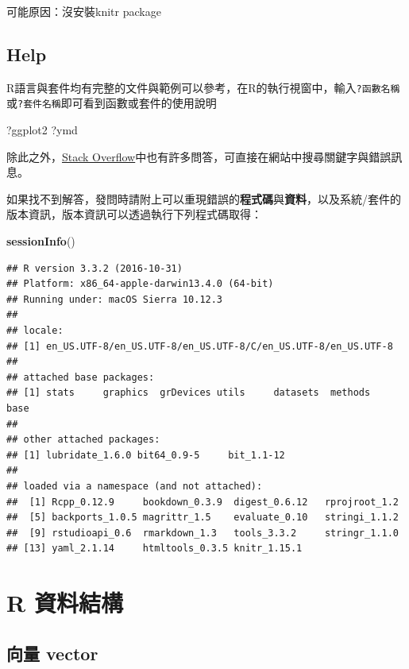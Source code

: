 \documentclass[]{book}
\newenvironment{Shaded}{\begin{snugshade}}{\end{snugshade}}
\newcommand{\KeywordTok}[1]{\textcolor[rgb]{0.13,0.29,0.53}{\textbf{{#1}}}}
\newcommand{\NormalTok}[1]{{#1}}
\theoremstyle{definition}
\theoremstyle{definition}
\theoremstyle{remark}
\begin{document}
可能原因：沒安裝knitr package

\section{Help}\label{help}

R語言與套件均有完整的文件與範例可以參考，在R的執行視窗中，輸入\texttt{?函數名稱}或\texttt{?套件名稱}即可看到函數或套件的使用說明

\begin{Shaded}
\begin{Highlighting}[]
\NormalTok{?ggplot2}
\NormalTok{?ymd}
\end{Highlighting}
\end{Shaded}

除此之外，\href{http://stackoverflow.com/}{Stack
Overflow}中也有許多問答，可直接在網站中搜尋關鍵字與錯誤訊息。

如果找不到解答，發問時請附上可以重現錯誤的\textbf{程式碼}與\textbf{資料}，以及系統/套件的版本資訊，版本資訊可以透過執行下列程式碼取得：

\begin{Shaded}
\begin{Highlighting}[]
\KeywordTok{sessionInfo}\NormalTok{()}
\end{Highlighting}
\end{Shaded}

\begin{verbatim}
## R version 3.3.2 (2016-10-31)
## Platform: x86_64-apple-darwin13.4.0 (64-bit)
## Running under: macOS Sierra 10.12.3
## 
## locale:
## [1] en_US.UTF-8/en_US.UTF-8/en_US.UTF-8/C/en_US.UTF-8/en_US.UTF-8
## 
## attached base packages:
## [1] stats     graphics  grDevices utils     datasets  methods   base     
## 
## other attached packages:
## [1] lubridate_1.6.0 bit64_0.9-5     bit_1.1-12     
## 
## loaded via a namespace (and not attached):
##  [1] Rcpp_0.12.9     bookdown_0.3.9  digest_0.6.12   rprojroot_1.2  
##  [5] backports_1.0.5 magrittr_1.5    evaluate_0.10   stringi_1.1.2  
##  [9] rstudioapi_0.6  rmarkdown_1.3   tools_3.3.2     stringr_1.1.0  
## [13] yaml_2.1.14     htmltools_0.3.5 knitr_1.15.1
\end{verbatim}

\chapter{R 資料結構}\label{RDataStructure}

\section{向量 vector}\label{-vector}
\end{document}
